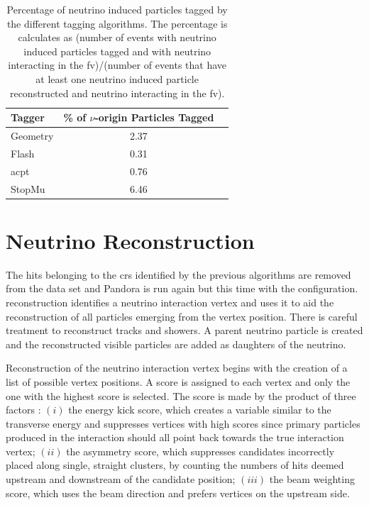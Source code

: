 \begin{table}[]
\caption[Percentage of Misidentified Neutrino Induced Particles as Cosmic Rays]{Percentage of neutrino induced particles tagged by the different tagging algorithms. The percentage is calculates as (number of events with neutrino induced particles tagged and with neutrino interacting in the \acrshort{fv})/(number of events that have at least one neutrino induced particle reconstructed and neutrino interacting in the \acrshort{fv}).}
\label{tab:tagging_perf}
\centering
\begin{tabular}{lcr}
\toprule
Tagger & \% of $\nu$-origin Particles Tagged  \\
\midrule
Geometry     & 2.37  \\
Flash        & 0.31  \\
\acrshort{acpt}         & 0.76  \\
StopMu       & 6.46  \\
\bottomrule
\end{tabular}
\end{table}






\section{Neutrino Reconstruction}
\label{sec:neutrino_reconstruction}

The hits belonging to the \acrshort{cr}s identified by the previous algorithms are removed from the data set and Pandora is run again but this time with the \pn configuration. \pn reconstruction identifies a neutrino interaction vertex and uses it to aid the reconstruction of all particles emerging from the vertex position. There is careful treatment to reconstruct tracks and showers. A parent neutrino particle is created and the reconstructed visible particles are added as daughters of the neutrino.

Reconstruction of the neutrino interaction vertex begins with the creation of a list of possible vertex positions. A score is assigned to each vertex and only the one with the highest score is selected. The score is made by the product of three factors \cite{pandora}: $(i)$ the energy kick score, which creates a variable similar to the transverse energy and suppresses vertices with high scores since primary particles produced in the interaction should all point back towards the true interaction vertex; $(ii)$ the asymmetry score, which suppresses candidates incorrectly placed along single, straight clusters, by counting the numbers of hits deemed upstream and downstream of the candidate position; $(iii)$ the beam weighting score, which uses the beam direction and prefers vertices on the upstream side.

